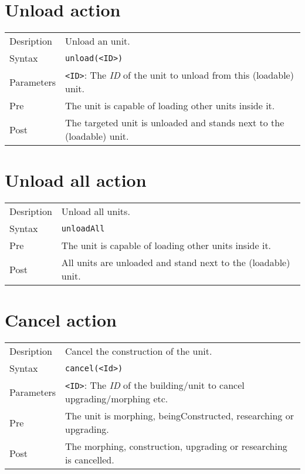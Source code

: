 \section{Unload action}
\begin{tabularx}{\textwidth}{lX}
 Desription & Unload an unit. \\
 Syntax & \verb|unload(<ID>)| \\
 Parameters & \verb|<ID>|: The \textit{ID} of the unit to unload from this (loadable) unit.\\
 Pre & The unit is capable of loading other units inside it. \\
 Post & The targeted unit is unloaded and stands next to the (loadable) unit.
\end{tabularx}

\section{Unload all action}
\begin{tabularx}{\textwidth}{lX}
 Desription & Unload all units. \\
 Syntax & \verb|unloadAll| \\
 Pre & The unit is capable of loading other units inside it. \\
 Post & All units are unloaded and stand next to the (loadable) unit.
\end{tabularx}

\section{Cancel action}
\begin{tabularx}{\textwidth}{lX}
 Desription & Cancel the construction of the unit. \\
 Syntax & \verb|cancel(<Id>)| \\
 Parameters & \verb|<ID>|: The \textit{ID} of the building/unit to cancel upgrading/morphing etc.\\
 Pre & The unit is morphing, beingConstructed, researching or upgrading. \\
 Post & The morphing, construction, upgrading or researching is cancelled.
\end{tabularx}

